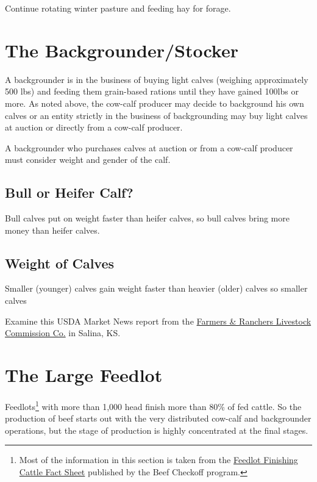\documentclass[
]{book}
\begin{document}
Continue rotating winter pasture and feeding hay for forage.

\hypertarget{the-backgrounderstocker}{%
\section{The Backgrounder/Stocker}\label{the-backgrounderstocker}}

A backgrounder is in the business of buying light calves (weighing approximately 500 lbs) and feeding them grain-based rations until they have gained 100lbs or more. As noted above, the cow-calf producer may decide to background his own calves or an entity strictly in the business of backgrounding may buy light calves at auction or directly from a cow-calf producer.

A backgrounder who purchases calves at auction or from a cow-calf producer must consider weight and gender of the calf.

\hypertarget{bull-or-heifer-calf}{%
\subsection{Bull or Heifer Calf?}\label{bull-or-heifer-calf}}

Bull calves put on weight faster than heifer calves, so bull calves bring more money than heifer calves.

\hypertarget{weight-of-calves}{%
\subsection{Weight of Calves}\label{weight-of-calves}}

Smaller (younger) calves gain weight faster than heavier (older) calves so smaller calves

Examine this USDA Market News report from the \href{http://www.ams.usda.gov/mnreports/dc_ls143.txt}{Farmers \& Ranchers Livestock Commission Co.} in Salina, KS.

\hypertarget{the-large-feedlot}{%
\section{The Large Feedlot}\label{the-large-feedlot}}

Feedlots\footnote{Most of the information in this section is taken from the \href{http://www.beefusa.org/uDocs/Feedlot\%20finishing\%20fact\%20sheet\%20FINAL_4\%2026\%2006.pdf}{Feedlot Finishing Cattle Fact Sheet} published by the Beef Checkoff program.} with more than 1,000 head finish more than 80\% of fed cattle. So the production of beef starts out with the very distributed cow-calf and backgrounder operations, but the stage of production is highly concentrated at the final stages.
\end{document}
